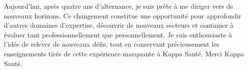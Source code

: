 \vspace{0.5cm}
Aujourd’hui, après quatre ans d'alternance, je suis prête à me diriger vers de nouveaux horizons. Ce changement constitue une opportunité pour approfondir d'autres domaines d'expertise, découvrir de nouveaux secteurs et continuer à évoluer tant professionnellement que personnellement. Je suis enthousiaste à l’idée de relever de nouveaux défis, tout en conservant précieusement les enseignements tirés de cette expérience marquante à Kappa Santé. Merci Kappa Santé.

